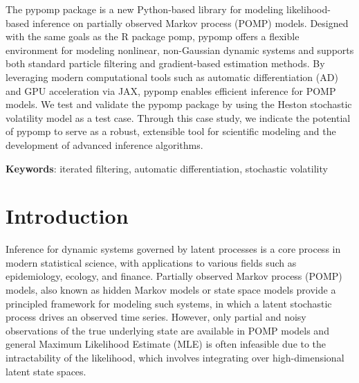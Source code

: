 \documentclass[11pt]{report}
\begin{document}
\normalsize
\justifying %
\doublespacing
The pypomp package is a new Python-based library for modeling likelihood-based inference on partially observed Markov process (POMP) models. Designed with the same goals as the R package pomp, pypomp offers a flexible environment for modeling nonlinear, non-Gaussian dynamic systems and supports both standard particle filtering and gradient-based estimation methods. By leveraging modern computational tools such as automatic differentiation (AD) and GPU acceleration via JAX, pypomp enables efficient inference for POMP models. We test and validate the pypomp package by using the Heston stochastic volatility model as a test case. Through this case study, we indicate the potential of pypomp to serve as a robust, extensible tool for scientific modeling and the development of advanced inference algorithms.
\par

\par\vspace{20pt}
\textbf{Keywords}: iterated filtering, automatic differentiation, stochastic volatility

\newpage


\renewcommand*\contentsname{Table of Contents}
\tableofcontents

\bigskip



\chapter{Introduction}\label{chap:intro}
Inference for dynamic systems governed by latent processes is a core process in modern statistical science, with applications to various fields such as epidemiology, ecology, and finance. Partially observed Markov process (POMP) models, also known as hidden Markov models or state space models provide a principled framework for modeling such systems, in which a latent stochastic process drives an observed time series. However, only partial and noisy observations of the true underlying state are available in POMP models and general Maximum Likelihood Estimate (MLE) is often infeasible due to the intractability of the likelihood, which involves integrating over high-dimensional latent state spaces. 
\end{document}
